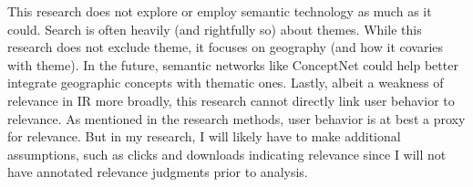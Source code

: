 This research does not explore or employ semantic technology as much as it could. Search is often heavily (and rightfully so) about themes. While this research does not exclude theme, it focuses on geography (and how it covaries with theme). In the future, semantic networks like ConceptNet could help better integrate geographic concepts with thematic ones. Lastly, albeit a weakness of relevance in IR more broadly, this research cannot directly link user behavior to relevance. As mentioned in the research methods, user behavior is at best a proxy for relevance. But in my research, I will likely have to make additional assumptions, such as clicks and downloads indicating relevance since I will not have annotated relevance judgments prior to analysis.